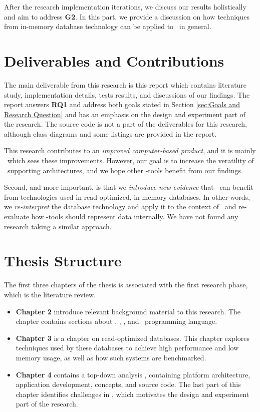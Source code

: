 After the research implementation iterations, we discuss our results holistically and aim to address \textbf{G2}. In this part, we provide a discussion on how techniques from in-memory database technology can be applied to \mde~in general. 

\section{Deliverables and Contributions}
\label{sec:Deliverables and Contributions}
The main deliverable from this research is this report which contains literature study, implementation details, tests results, and discussions of our findings. The report answers \textbf{RQ1} and address both goals stated in Section \ref{sec:Goals and Research Question} and has an emphasis on the design and experiment part of the research. The source code is not a part of the deliverables for this research, although class diagrams and some listings are provided in the report.

This research contributes to an \textit{improved computer-based product}, and it is mainly \gap~which sees these improvements. However, our goal is to increase the veratility of \mde~supporting architectures, and we hope other \mdd-tools benefit from our findings. 

Second, and more important, is that we \textit{introduce new evidence} that \mde~can benefit from technologies used in read-optimized, in-memory databases. In other words, we \textit{re-interpret} the database technology and apply it to the context of \mde~and re-evaluate how \mdd-tools should represent data internally. We have not found any research taking a similar approach. 

\section{Thesis Structure}
\label{sec:Thesis Structure}
The first three chapters of the thesis is associated with the first research phase, which is the literature review.
\begin{itemize}
    \item \textbf{Chapter 2} introduce relevant background material to this research. The chapter contains sections about \mde, \bi, \bd, and \delphi~programming language.
    \item \textbf{Chapter 3} is a chapter on read-optimized databases. This chapter explores techniques used by these databases to achieve high performance and low memory usage, as well as how such systems are benchmarked. 
    \item \textbf{Chapter 4} contains a top-down analysis \gap, containing platform architecture, application development, concepts, and source code. The last part of this chapter identifies challenges in \gap, which motivates the design and experiment part of the research.
\end{itemize}

